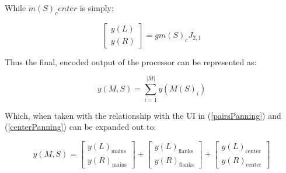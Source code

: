 While $m(S)_center$ is simply:

\begin{equation}
	\begin{bmatrix} y(L) \\ y(R) \end{bmatrix} = gm(S)_{c}J_{2,1}
\end{equation}

Thus the final, encoded output of the processor can be represented as:

\begin{equation}
	y(M, S) =  \sum\limits_{i=1}^{|M|} y(M(S)_i)
\end{equation}

Which, when taken with the relationship with the UI in (\ref{pairsPanning}) and (\ref{centerPanning}) can be expanded out to:

\begin{equation}
	y(M, S) = \begin{bmatrix} y(L)_\text{mains} \\ y(R)_\text{mains} \end{bmatrix} + \begin{bmatrix} y(L)_\text{flanks} \\ y(R)_\text{flanks} \end{bmatrix} + \begin{bmatrix} y(L)_\text{center} \\ y(R)_\text{center} \end{bmatrix}
\end{equation}